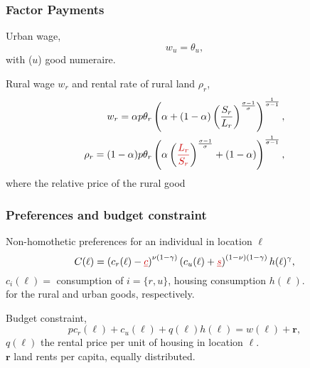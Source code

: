 \documentclass[aspectratio=169]{beamer}
\begin{document}
\begin{v75mins}
\begin{frame}
\frametitle{Factor Payments}

Urban wage,
\begin{equation*}w_u=\theta_u, \end{equation*}
with ($u$) good numeraire.

\bigskip
\pause
Rural wage $w_r$ and rental rate of rural land $\rho_r$,
\vspace{-0.5cm}
\begin{eqnarray*}
w_r=\alpha p\theta_r\left(\alpha  +(1-\alpha)\left(\frac{S_r}{L_r}\right)^{\frac{\sigma-1}{\sigma}} \right)^{\frac{1}{\sigma-1}}, \\
\rho_r=(1-\alpha)p\theta_r\left(\alpha \left(\re{\frac{L_r}{S_r}}\right)^{\frac{\sigma-1}{\sigma}} +(1-\alpha) \right)^{\frac{1}{\sigma-1}},
\end{eqnarray*}
where  the relative price of the rural good\\
\end{frame}\end{v75mins}

\begin{frame}[label=preference]
\frametitle{Preferences and budget constraint}
\begin{midi}
\item Non-homothetic preferences for an individual in location $\ell$
\begin{equation*}
C(\ell)=\left( c_r(\ell)-\re{\underline{c}}\right)^{\nu(1-\gamma)} \left(c_u(\ell) + \re{\underline{s}}\right) ^{(1-\nu)(1-\gamma)}h(\ell)^\gamma,
\end{equation*}
$c_i(\ell)=$ consumption of $i=\{r,u\}$, housing consumption $h(\ell)$.\\
 for the rural and urban goods, respectively.\\
\item Budget constraint,
\begin{equation*}
pc_r(\ell)+c_u(\ell)+q(\ell)h(\ell)=w(\ell)+\mathbf{r},
\end{equation*}
$q(\ell)$ the rental price per unit of housing in location $\ell$.\\
$\mathbf{r}$ land rents per capita, equally distributed.
\end{midi}
\end{frame}
\end{document}
